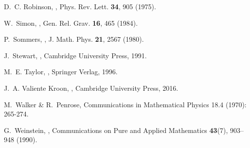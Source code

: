 \documentclass[10pt,a4paper]{article}
\theoremstyle{plain}
\begin{document}
\begin{thebibliography}{10}
D.~C. Robinson,
,
\newblock Phys. Rev. Lett. {\bf 34}, 905 (1975).

W.~Simon,
,
\newblock Gen. Rel. Grav. {\bf 16}, 465 (1984).

P.~Sommers,
,
\newblock J. Math. Phys. {\bf 21}, 2567 (1980).

J.~Stewart,
,
\newblock Cambridge University Press, 1991.

M.~E. Taylor,
,
\newblock Springer Verlag, 1996.

J.~A. {Valiente Kroon},
,
\newblock Cambridge University Press, 2016.

M.~Walker \& R.~Penrose,
\newblock Communications in Mathematical Physics 18.4 (1970): 265-274.

G.~Weinstein,
,
\newblock Communications on Pure and Applied Mathematics {\bf 43}(7), 903--948
  (1990).

\end{thebibliography}
\end{document}
